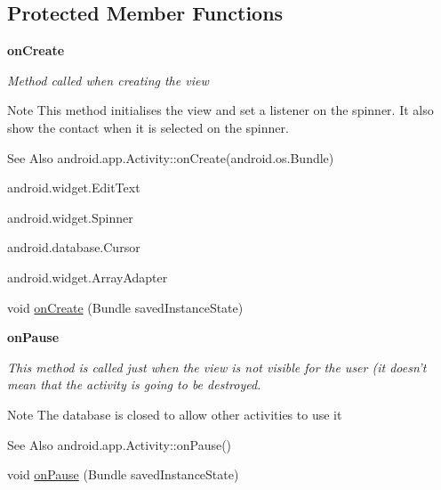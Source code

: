 \subsection*{Protected Member Functions}
\begin{Indent}{\bf on\-Create}\par
{\em Method called when creating the view

\begin{DoxyNote}{Note}
This method initialises the view and set a listener on the spinner. It also show the contact when it is selected on the spinner. 
\end{DoxyNote}
\begin{DoxySeeAlso}{See Also}
android.\-app.\-Activity\-::on\-Create(android.\-os.\-Bundle) 

android.\-widget.\-Edit\-Text 

android.\-widget.\-Spinner 

android.\-database.\-Cursor 

android.\-widget.\-Array\-Adapter 
\end{DoxySeeAlso}
}\begin{DoxyCompactItemize}
\item 
void \hyperlink{classnpi_1_1practicaandroid_1_1tutorialnpi_1_1_read_contact_af91fb02335cf6aa8cf58d398f0409ce1}{on\-Create} (Bundle saved\-Instance\-State)
\end{DoxyCompactItemize}
\end{Indent}
\begin{Indent}{\bf on\-Pause}\par
{\em This method is called just when the view is not visible for the user (it doesn't mean that the activity is going to be destroyed.

\begin{DoxyNote}{Note}
The database is closed to allow other activities to use it
\end{DoxyNote}
\begin{DoxySeeAlso}{See Also}
android.\-app.\-Activity\-::on\-Pause() 
\end{DoxySeeAlso}
}\begin{DoxyCompactItemize}
\item 
void \hyperlink{classnpi_1_1practicaandroid_1_1tutorialnpi_1_1_read_contact_a814d7887a4af5725e298313d7c985442}{on\-Pause} (Bundle saved\-Instance\-State)
\end{DoxyCompactItemize}
\end{Indent}
